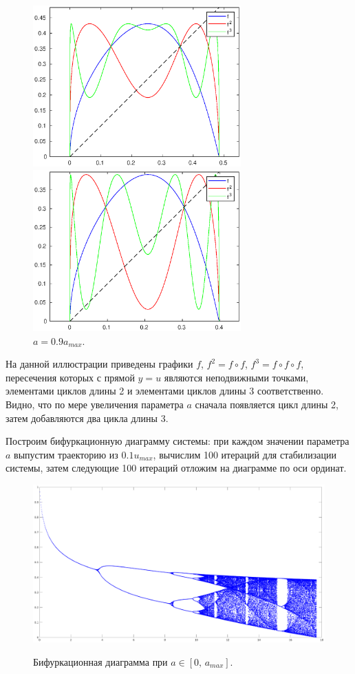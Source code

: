 \documentclass[16pt]{article}
\begin{document}
\begin{figure}[h]
\begin{multicols}{2}
	\hfill
	\includegraphics[width=80mm]{f3.eps}
	\hfill
	\caption{$a = 0.5a_{max}$.}
	\hfill
	\includegraphics[width=80mm]{f4.eps}
	\hfill
	\caption{$a = 0.9a_{max}$.}
    \hfill
\end{multicols}
\end{figure}	

На данной иллюстрации приведены графики $f$, $f^2 = f \circ f$, $f^3 = f \circ f \circ f$, пересечения которых
с прямой $y = u$ являются неподвижными точками, элементами циклов длины 2 и элементами циклов длины 3 
соответственно. Видно, что по мере увеличения параметра $a$ сначала появляется цикл длины 2, затем
добавляются два цикла длины 3.

Построим бифуркационную диаграмму системы: при каждом значении параметра $a$ выпустим траекторию из
$0.1u_{max}$, вычислим 100 итераций для стабилизации системы, затем
следующие 100 итераций отложим на диаграмме по оси ординат.
\newpage

\begin{figure}[h]
\begin{center}
\includegraphics[width=140mm]{bif.eps} \label{bif}
\caption{Бифуркационная диаграмма при $a \in [0,\,a_{max}]$.}
\end{center}
\end{figure}
\end{document}
